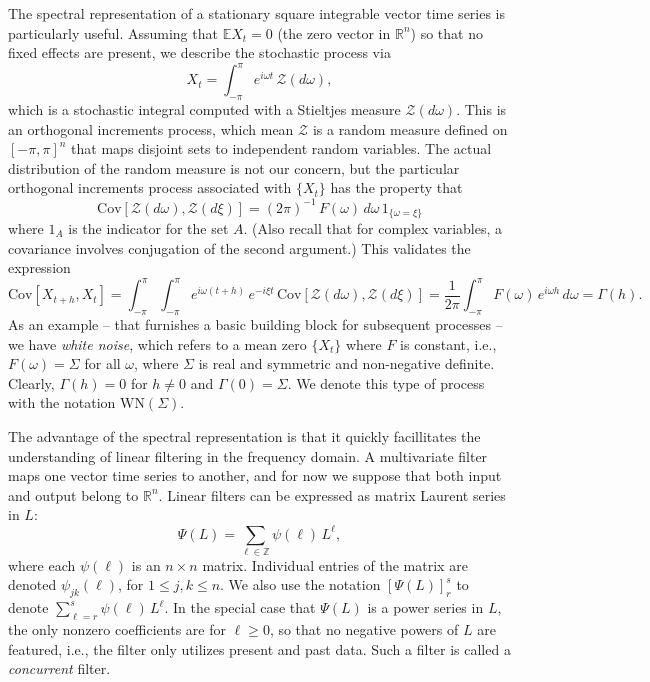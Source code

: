 \documentclass[a4paper]{book}
\def\RR{\mathbb R}
\def\ZZ{\mathbb Z}
\def\EE{\mathbb E}
\begin{document}
 The spectral representation of a stationary square integrable vector 
time series is particularly useful.  Assuming that $\EE X_t = 0$ (the
 zero vector in $\RR^n$) so that no fixed effects are present, we describe
 the stochastic process via
\begin{equation}
\label{eq:specRep}
  X_t = \int_{-\pi}^{\pi} e^{i \omega t} \, \mathcal{Z} (d\omega),
\end{equation}
 which is a stochastic integral computed with a Stieltjes measure
 $\mathcal{Z} (d\omega)$.  This is an orthogonal increments process,
 which mean $\mathcal{Z}$ is a random measure defined on ${[-\pi,\pi]}^n$
 that maps disjoint sets to independent random variables.  The actual
 distribution of the random measure is not our concern, but the particular
 orthogonal increments process associated with $\{ X_t \}$ has the 
 property that
\[
  \mbox{Cov} [ \mathcal{Z} (d\omega), \mathcal{Z} (d\xi) ]
   = {(2 \pi)}^{-1} \, F (\omega) \, d\omega \, 1_{ \{   \omega = \xi \} }
\]
 where $1_A$ is the indicator for the set $A$.
  (Also recall that for complex variables, a 
covariance involves conjugation of
 the second argument.)  This validates the expression
\[
  \mbox{Cov} [ X_{t+h}, X_t ] =
 \int_{-\pi}^{\pi}  \int_{-\pi}^{\pi} e^{i \omega (t+h)} \,
  e^{-i \xi t } \, \mbox{Cov} [ \mathcal{Z} (d\omega), 
  \mathcal{Z} (d\xi) ] 
 =  \frac{1}{2 \pi} \int_{-\pi}^{\pi} F(\omega) \, e^{i \omega h}
  \, d\omega = \Gamma (h).
\]
 As an example -- that furnishes a basic building block for subsequent processes --
 we have {\em white noise}, which refers to a mean zero $\{ X_t \}$ where $F$ is constant, i.e.,
 $F(\omega) = \Sigma$ for all $\omega$, where $\Sigma $ is real and symmetric and
 non-negative definite.  Clearly, $\Gamma (h) = 0$ for $h \neq 0$ and $\Gamma (0) = \Sigma$.
 We denote this type of process with the notation $\mbox{WN} (\Sigma)$.

 The advantage of the spectral representation is that it quickly facillitates
 the understanding of linear filtering in the frequency domain.
 A multivariate filter maps one vector time series to another, and for
 now we suppose that both input and output belong to $\RR^n$.
 Linear filters can be expressed as matrix Laurent series in $L$:
\[
 \Psi (L) = \sum_{\ell \in \ZZ} \psi (\ell) \, L^{\ell},
\]
 where each $\psi (\ell)$ is an $n \times n$ matrix.  
 Individual entries of the matrix are denoted $\psi_{jk} (\ell)$,
 for $1 \leq j, k \leq n$.   We also use the notation
  $ {[\Psi (L) ]}^{s}_r $ to denote $\sum_{\ell=r}^s
  \psi (\ell) \, L^{\ell}$. In the special case that $\Psi (L)$ is a power
 series in $L$, the only nonzero coefficients are for $\ell \geq 0$, 
 so that no negative powers of $L$ are featured, i.e., the filter
 only utilizes present and past data.  Such a filter is called a 
 {\em concurrent} filter.  
\end{document}

